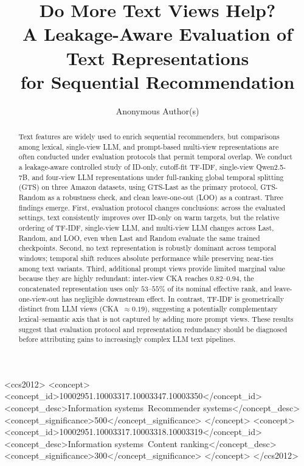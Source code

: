 \documentclass[sigconf,natbib=true,anonymous]{acmart}
\newcommand{\tfidf}{\textsc{TF-IDF}\xspace}
\newcommand{\llm}{\textsc{LLM}\xspace}
\begin{document}
\title{Do More Text Views Help?\\
A Leakage-Aware Evaluation of Text Representations\\
for Sequential Recommendation}

\author{Anonymous Author(s)}
\renewcommand{\shortauthors}{Anonymous}

\begin{abstract}
Text features are widely used to enrich sequential recommenders, but comparisons among lexical, single-view LLM, and prompt-based multi-view representations are often conducted under evaluation protocols that permit temporal overlap.
We conduct a leakage-aware controlled study of ID-only, cutoff-fit \tfidf, single-view Qwen2.5-7B, and four-view \llm representations under full-ranking global temporal splitting (GTS) on three Amazon datasets, using GTS-Last as the primary protocol, GTS-Random as a robustness check, and clean leave-one-out (LOO) as a contrast.
Three findings emerge.
First, evaluation protocol changes conclusions: across the evaluated settings, text consistently improves over ID-only on warm targets, but the relative ordering of \tfidf, single-view \llm, and multi-view \llm changes across Last, Random, and LOO, even when Last and Random evaluate the same trained checkpoints.
Second, no text representation is robustly dominant across temporal windows; temporal shift reduces absolute performance while preserving near-ties among text variants.
Third, additional prompt views provide limited marginal value because they are highly redundant: inter-view CKA reaches $0.82$--$0.94$, the concatenated representation uses only $53$--$55\%$ of its nominal effective rank, and leave-one-view-out has negligible downstream effect.
In contrast, \tfidf is geometrically distinct from \llm views (CKA~$\approx 0.19$), suggesting a potentially complementary lexical--semantic axis that is not captured by adding more prompt views.
These results suggest that evaluation protocol and representation redundancy should be diagnosed before attributing gains to increasingly complex LLM text pipelines.
\end{abstract}

\begin{CCSXML}
<ccs2012>
 <concept>
  <concept_id>10002951.10003317.10003347.10003350</concept_id>
  <concept_desc>Information systems~Recommender systems</concept_desc>
  <concept_significance>500</concept_significance>
 </concept>
 <concept>
  <concept_id>10002951.10003317.10003318.10003319</concept_id>
  <concept_desc>Information systems~Content ranking</concept_desc>
  <concept_significance>300</concept_significance>
 </concept>
</ccs2012>
\end{CCSXML}
\end{document}
